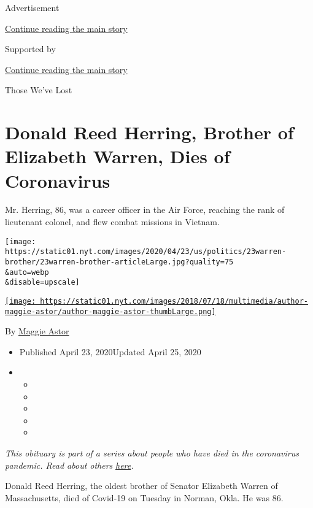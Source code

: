Advertisement

\protect\hyperlink{after-top}{Continue reading the main story}

Supported by

\protect\hyperlink{after-sponsor}{Continue reading the main story}

Those We've Lost

\hypertarget{donald-reed-herring-brother-of-elizabeth-warren-dies-of-coronavirus}{%
\section{Donald Reed Herring, Brother of Elizabeth Warren, Dies of
Coronavirus}\label{donald-reed-herring-brother-of-elizabeth-warren-dies-of-coronavirus}}

Mr. Herring, 86, was a career officer in the Air Force, reaching the
rank of lieutenant colonel, and flew combat missions in Vietnam.

\texttt{[image: https://static01.nyt.com/images/2020/04/23/us/politics/23warren-brother/23warren-brother-articleLarge.jpg?quality=75\\\&auto=webp\\\&disable=upscale]}

\href{https://www.nytimes.com/by/maggie-astor}{\texttt{[image: https://static01.nyt.com/images/2018/07/18/multimedia/author-maggie-astor/author-maggie-astor-thumbLarge.png]}}

By \href{https://www.nytimes.com/by/maggie-astor}{Maggie Astor}

\begin{itemize}
\item
  Published April 23, 2020Updated April 25, 2020
\item
  \begin{itemize}
  \item
  \item
  \item
  \item
  \item
  \end{itemize}
\end{itemize}

\emph{This obituary is part of a series about people who have died in
the coronavirus pandemic. Read about others}
\href{https://www.nytimes.com/series/people-who-have-died-of-the-coronavirus}{\emph{here}}\emph{.}

Donald Reed Herring, the oldest brother of Senator Elizabeth Warren of
Massachusetts, died of Covid-19 on Tuesday in Norman, Okla. He was 86.

